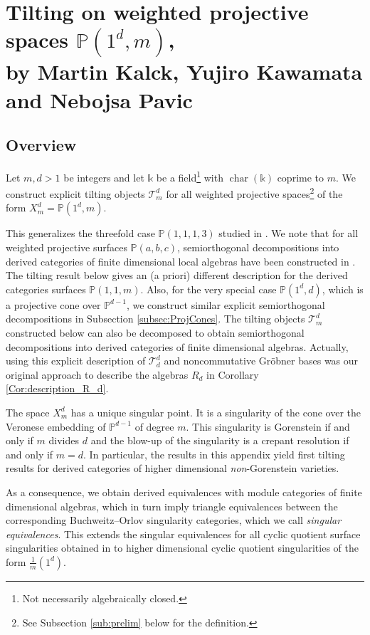 \documentclass[a4paper,11pt, reqno]{amsart}
\def\P{\mathbb P}
\def\sT{\mathscr{T}}
\def\chr{{\operatorname{char}}}
\theoremstyle{plain}
\theoremstyle{definition}
\numberwithin{equation}{section}
\begin{document}
\appendix
\section{Tilting on weighted projective spaces \texorpdfstring{$\P(1^d, m)$}{P(d, m)\textasciicircum wps}, \texorpdfstring{\\ by Martin Kalck, Yujiro Kawamata and Nebojsa Pavic}{}}\label{sec:appendix}

\subsection{Overview}
\noindent
 Let $m,d > 1$ be integers and let $\mathbb{k}$ be a field\footnote{Not necessarily algebraically closed.} with $\chr( \mathbb{k})$ coprime to $m$. We construct explicit tilting objects $\sT_m^d$ for all weighted projective spaces\footnote{See Subsection \ref{sub:prelim} below for the definition.} of the form $X_m^d=\P(1^d, m)$. 

This generalizes the threefold case $\P(1, 1, 1, 3)$ studied in \cite{kawamata3}. We note that for all weighted projective surfaces $\P(a, b, c)$, semiorthogonal decompositions into derived categories of finite dimensional local algebras have been constructed in \cite{kks}. The tilting result below gives an (a priori) different description for the derived categories surfaces $\P(1, 1, m)$.
Also, for the very special case $\P(1^d, d)$, which is a projective cone over $\P^{d-1}$, we construct similar explicit semiorthogonal decompositions in Subsection \ref{subsec:ProjCones}. The tilting objects  $\sT_m^d$ constructed below can also be decomposed to obtain semiorthogonal decompositions into derived categories of finite dimensional algebras. Actually, using this explicit description of $\sT_d^d$ and noncommutative Gr{\"o}bner bases was our original approach to describe the algebras $R_d$ in Corollary \ref{Cor:description_R_d}. 

The space $X_m^d$ has a unique singular point.  
It is a singularity of the cone over the Veronese embedding of $\P^{d-1}$ of degree $m$.
This singularity is Gorenstein if and only if $m$ divides $d$ and  
the blow-up of the singularity is a crepant resolution
if and only if $m=d$. In particular, the results in this appendix yield first tilting results for derived categories of higher dimensional \emph{non}-Gorenstein varieties. 


As a consequence, we obtain derived equivalences with module categories of finite dimensional algebras, which in turn imply triangle equivalences between the corresponding Buchweitz--Orlov singularity categories, which we call \emph{singular equivalences}. This extends the singular equivalences for all cyclic quotient surface singularities obtained in \cite{kalck-karmazyn} to higher dimensional cyclic quotient singularities of the form $\frac{1}{m}(1^d)$. 
\end{document}
